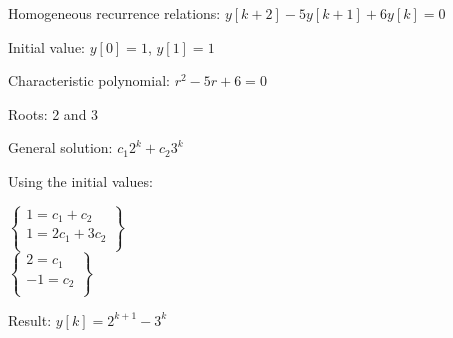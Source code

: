 \begin{frame}
	\begin{example}
		
		\begin{itemize}
			\small{
			\item Homogeneous recurrence relations: $y[k+2]-5y[k+1]+6y[k] = 0$
			\item Initial value: $y[0] =1$, $y[1] = 1$
			\item Characteristic polynomial: $r^2-5r+6=0$
			\item Roots: 2 and 3
			\item General solution: $c_1 2^k + c_2 3^k$
			\item Using the initial values: 
			\begin{center}
				$
				\begin{Bmatrix}
					1 = c_1 + c_2\\
					1 = 2c_1 + 3c_2\\
				\end{Bmatrix}
				$\\
					$
					\begin{Bmatrix}
					2 = c_1 \\
					-1 = c_2\\
					\end{Bmatrix}
					$\\
			\end{center}
			\item Result: $y[k] = 2^{k+1} - 3^{k}$}
		\end{itemize}
	\end{example}
\end{frame}
